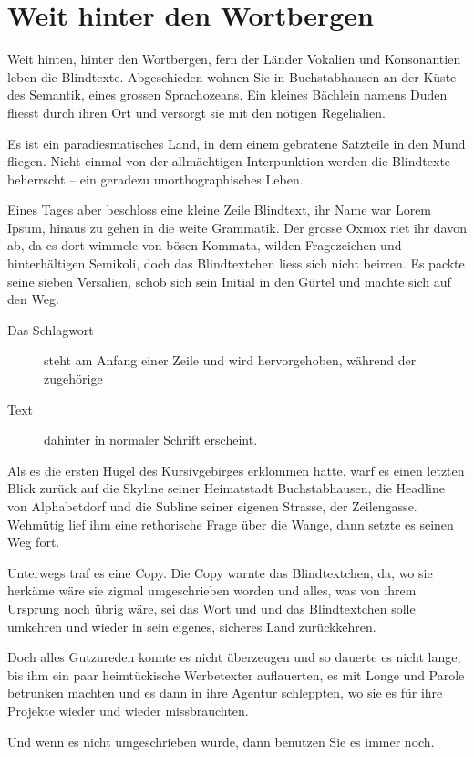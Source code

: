 \section{Weit hinter den Wortbergen}

Weit hinten, hinter den Wortbergen, fern der Länder Vokalien und Konsonantien leben die Blindtexte. Abgeschieden wohnen Sie in Buchstabhausen an der Küste des Semantik, eines grossen Sprachozeans. Ein kleines Bächlein namens Duden fliesst durch ihren Ort und versorgt sie mit den nötigen Regelialien.

Es ist ein paradiesmatisches Land, in dem einem gebratene Satzteile in den Mund fliegen. Nicht einmal von der allmächtigen Interpunktion werden die Blindtexte beherrscht -- ein geradezu unorthographisches Leben.

Eines Tages aber beschloss eine kleine Zeile Blindtext, ihr Name war Lorem Ipsum, hinaus zu gehen in die weite Grammatik. Der grosse Oxmox riet ihr davon ab, da es dort wimmele von bösen Kommata, wilden Fragezeichen und hinterhältigen Semikoli, doch das Blindtextchen liess sich nicht beirren. Es packte seine sieben Versalien, schob sich sein Initial in den Gürtel und machte sich auf den Weg.

\begin{description}
  \item[Das Schlagwort] steht am Anfang einer Zeile und wird hervorgehoben, während der zugehörige
  \item[Text] dahinter in normaler Schrift erscheint.
\end{description}

Als es die ersten Hügel des Kursivgebirges erklommen hatte, warf es einen letzten Blick zurück auf die Skyline seiner Heimatstadt Buchstabhausen, die Headline von Alphabetdorf und die Subline seiner eigenen Strasse, der Zeilengasse. Wehmütig lief ihm eine rethorische Frage über die Wange, dann setzte es seinen Weg fort.

Unterwegs traf es eine Copy. Die Copy warnte das Blindtextchen, da, wo sie herkäme wäre sie zigmal umgeschrieben worden und alles, was von ihrem Ursprung noch übrig wäre, sei das Wort und und das Blindtextchen solle umkehren und wieder in sein eigenes, sicheres Land zurückkehren.

Doch alles Gutzureden konnte es nicht überzeugen und so dauerte es nicht lange, bis ihm ein paar heimtückische Werbetexter auflauerten, es mit Longe und Parole betrunken machten und es dann in ihre Agentur schleppten, wo sie es für ihre Projekte wieder und wieder missbrauchten.

Und wenn es nicht umgeschrieben wurde, dann benutzen Sie es immer noch.